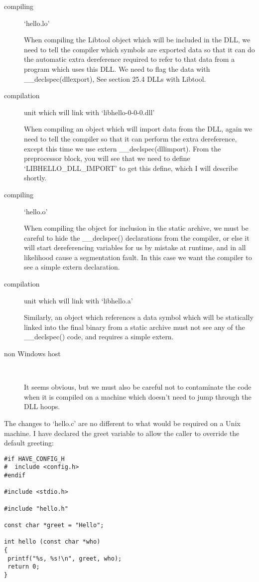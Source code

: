 \begin{description}
\item[compiling] `hello.lo'

    When compiling the Libtool object which will be included in the DLL, we need to tell the compiler which symbols are exported data so that it can do the automatic extra dereference required to refer to that data from a program which uses this DLL. We need to flag the data with \_{}\_{}declspec(dllexport), See section 25.4 DLLs with Libtool.

\item[compilation] unit which will link with `libhello-0-0-0.dll'

    When compiling an object which will import data from the DLL, again we need to tell the compiler so that it can perform the extra dereference, except this time we use extern \_{}\_{}declspec(dllimport). From the preprocessor block, you will see that we need to define `LIBHELLO\_{}DLL\_{}IMPORT' to get this define, which I will describe shortly.

\item[compiling] `hello.o'

    When compiling the object for inclusion in the static archive, we must be careful to hide the \_{}\_{}declspec() declarations from the compiler, or else it will start dereferencing variables for us by mistake at runtime, and in all likelihood cause a segmentation fault. In this case we want the compiler to see a simple extern declaration.

\item[compilation] unit which will link with `libhello.a'

    Similarly, an object which references a data symbol which will be statically linked into the final binary from a static archive must not see any of the \_{}\_{}declspec() code, and requires a simple extern.

\item[non Windows host]
\

    It seems obvious, but we must also be careful not to contaminate the code when it is compiled on a machine which doesn't need to jump through the DLL hoops.
\end{description}

The changes to `hello.c' are no different to what would be required on a Unix machine. I have declared the greet variable to allow the caller to override the default greeting:

\begin{Verbatim}[frame=single]
#if HAVE_CONFIG_H
#  include <config.h>
#endif

#include <stdio.h>

#include "hello.h"

const char *greet = "Hello";

int hello (const char *who)
{
 printf("%s, %s!\n", greet, who);
 return 0;
}
\end{Verbatim}

